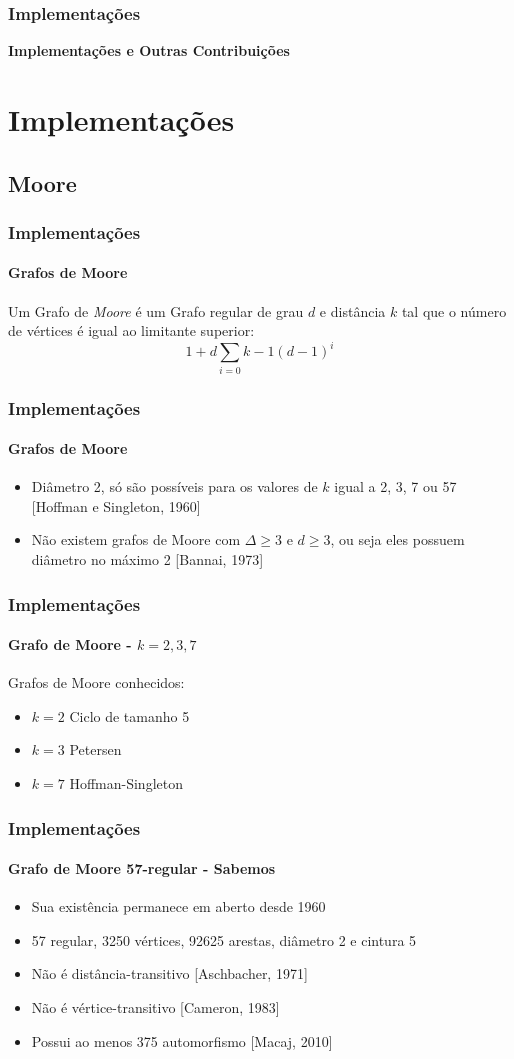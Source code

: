 \begin{frame}
\frametitle{Implementações}
\centering
\textbf{Implementações e Outras Contribuições}
\end{frame}

\section{Implementações}
\subsection{Moore}
\begin{frame}
\frametitle{Implementações}
\framesubtitle{Grafos de Moore}
Um Grafo de {\it Moore} é um Grafo regular de grau $d$ e distância $k$ tal que o número de vértices é igual ao limitante superior: $$1 + d\sum_{i=0}{k-1}(d-1)^i$$
\end{frame}


\begin{frame}
\frametitle{Implementações}
\framesubtitle{Grafos de Moore}
\begin{itemize}
    \item{Diâmetro 2, só são possíveis para os valores de $k$ igual a 2, 3, 7 ou 57 [Hoffman e Singleton, 1960]}
    \item{Não existem grafos de Moore com $\Delta \geq 3$ e $d\geq 3$, ou seja eles possuem diâmetro no máximo 2 [Bannai, 1973]}
\end{itemize}
\end{frame}

\begin{frame}
\frametitle{Implementações}
\framesubtitle{Grafo de Moore - $k={2,3,7}$}
Grafos de Moore conhecidos:
\begin{itemize}
    \item{$k=2$ Ciclo de tamanho 5}
    \item{$k=3$ Petersen}
    \item{$k=7$ Hoffman-Singleton}
\end{itemize}
\end{frame}

\begin{frame}
\frametitle{Implementações}
\framesubtitle{Grafo de Moore 57-regular - Sabemos}
\begin{itemize}
    \item{Sua existência permanece em aberto desde 1960}
    \item{57 regular, 3250 vértices, 92625 arestas, diâmetro 2 e cintura 5}
    \item{Não é distância-transitivo [Aschbacher, 1971]}
    \item{Não é vértice-transitivo [Cameron, 1983]}
    \item{Possui ao menos 375 automorfismo [Macaj, 2010]}
\end{itemize}
\end{frame}



